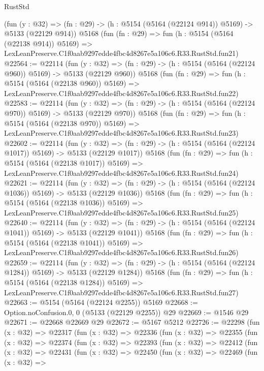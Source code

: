 \begin{lexlean}{RustStd}
\begin{coremodule}
    (fun (y : @32) => (fn : @29) -> (h : @5154 (@5164 (@22124 @914)) @5169) -> @5133 (@22129 @914))
    @5168
    (fun (fn : @29) =>
    fun (h : @5154 (@5164 (@22138 @914)) @5169) =>
    LexLeanPreserve.C1f0aab9297edde4fbc4d8267e5a106c6.R33.RustStd.fun21)
@22564 := @22114
    (fun (y : @32) => (fn : @29) -> (h : @5154 (@5164 (@22124 @960)) @5169) -> @5133 (@22129 @960))
    @5168
    (fun (fn : @29) =>
    fun (h : @5154 (@5164 (@22138 @960)) @5169) =>
    LexLeanPreserve.C1f0aab9297edde4fbc4d8267e5a106c6.R33.RustStd.fun22)
@22583 := @22114
    (fun (y : @32) => (fn : @29) -> (h : @5154 (@5164 (@22124 @970)) @5169) -> @5133 (@22129 @970))
    @5168
    (fun (fn : @29) =>
    fun (h : @5154 (@5164 (@22138 @970)) @5169) =>
    LexLeanPreserve.C1f0aab9297edde4fbc4d8267e5a106c6.R33.RustStd.fun23)
@22602 := @22114
    (fun (y : @32) =>
    (fn : @29) -> (h : @5154 (@5164 (@22124 @1017)) @5169) -> @5133 (@22129 @1017))
    @5168
    (fun (fn : @29) =>
    fun (h : @5154 (@5164 (@22138 @1017)) @5169) =>
    LexLeanPreserve.C1f0aab9297edde4fbc4d8267e5a106c6.R33.RustStd.fun24)
@22621 := @22114
    (fun (y : @32) =>
    (fn : @29) -> (h : @5154 (@5164 (@22124 @1036)) @5169) -> @5133 (@22129 @1036))
    @5168
    (fun (fn : @29) =>
    fun (h : @5154 (@5164 (@22138 @1036)) @5169) =>
    LexLeanPreserve.C1f0aab9297edde4fbc4d8267e5a106c6.R33.RustStd.fun25)
@22640 := @22114
    (fun (y : @32) =>
    (fn : @29) -> (h : @5154 (@5164 (@22124 @1041)) @5169) -> @5133 (@22129 @1041))
    @5168
    (fun (fn : @29) =>
    fun (h : @5154 (@5164 (@22138 @1041)) @5169) =>
    LexLeanPreserve.C1f0aab9297edde4fbc4d8267e5a106c6.R33.RustStd.fun26)
@22659 := @22114
    (fun (y : @32) =>
    (fn : @29) -> (h : @5154 (@5164 (@22124 @1284)) @5169) -> @5133 (@22129 @1284))
    @5168
    (fun (fn : @29) =>
    fun (h : @5154 (@5164 (@22138 @1284)) @5169) =>
    LexLeanPreserve.C1f0aab9297edde4fbc4d8267e5a106c6.R33.RustStd.fun27)
@22663 := @5154 (@5164 (@22124 @2255)) @5169
@22668 := Option.noConfusion.{0, 0} (@5133 (@22129 @2255)) @29
@22669 := @1546 @29
@22671 := @22668 @22669 @29
@22672 := @5167 @5212
@22726 := @22298
    (fun (x : @32) =>
    @22317
      (fun (x : @32) =>
      @22336
        (fun (x : @32) =>
        @22355
          (fun (x : @32) =>
          @22374
            (fun (x : @32) =>
            @22393
              (fun (x : @32) =>
              @22412
                (fun (x : @32) =>
                @22431
                  (fun (x : @32) =>
                  @22450
                    (fun (x : @32) =>
                    @22469
                      (fun (x : @32) =>

\end{coremodule}
\end{lexlean}
